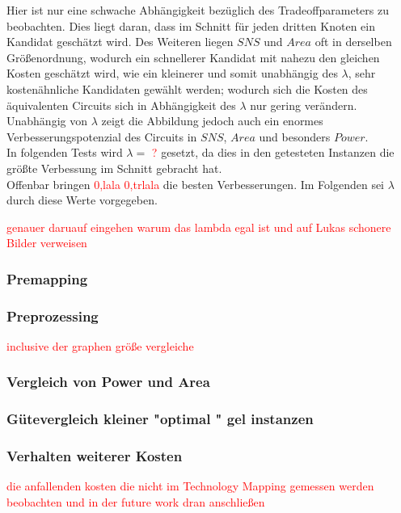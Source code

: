 \documentclass[11pt, a4paper, german]{article}
\newcommand{\TM}{Technology  Mapping }
\begin{document}
Hier ist nur eine schwache Abh\"angigkeit bez\"uglich des Tradeoffparameters zu beobachten. Dies liegt daran, dass im Schnitt f\"ur jeden dritten Knoten ein Kandidat gesch\"atzt wird. Des Weiteren liegen $SNS$ und $Area$ oft in derselben Gr\"o\ss enordnung, wodurch ein schnellerer Kandidat mit nahezu den gleichen Kosten gesch\"atzt wird, wie ein kleinerer und somit unabhängig des $\lambda$, sehr kosten\"ahnliche Kandidaten gew\"ahlt werden; wodurch sich die Kosten des \"aquivalenten Circuits sich in Abh\"angigkeit des $\lambda$ nur gering ver\"andern.\\
Unabh\"angig von $\lambda$ zeigt die Abbildung jedoch auch ein enormes Verbesserungspotenzial des Circuits in $SNS$, $Area$ und besonders $Power$.\\
In folgenden Tests wird $\lambda = $ \textcolor{red}{?} gesetzt, da dies in den getesteten Instanzen die gr\"o\ss te Verbessung im Schnitt gebracht hat.\\

Offenbar bringen \textcolor{red}{0,lala  0,trlala} die besten Verbesserungen. Im Folgenden sei $\lambda$ durch diese Werte vorgegeben. 

\textcolor{red}{genauer daruauf eingehen warum das lambda egal ist und auf Lukas schonere Bilder verweisen\\}


\subsubsection{Premapping}

\subsubsection{Preprozessing}
\textcolor{red}{inclusive der graphen größe vergleiche}

\subsubsection{Vergleich von Power und Area}


\subsubsection{Gütevergleich kleiner "optimal " gel instanzen}
\label{subsubsec:guetevgl_kleiner_opt_instanzen}


\subsubsection{Verhalten weiterer Kosten}
\textcolor{red}{die anfallenden kosten die nicht im \TM gemessen werden beobachten und in der future work dran anschließen}
\end{document}
